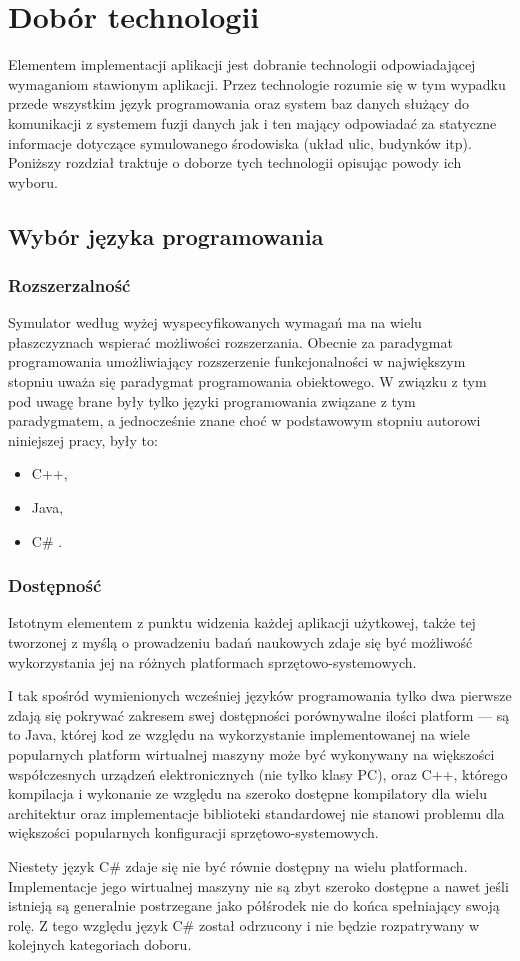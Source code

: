 {\section[Dobór technologii][Dobór technologii]{Dobór technologii}
\par{
Elementem implementacji aplikacji jest dobranie technologii odpowiadającej wymaganiom stawionym aplikacji. Przez technologie rozumie się w tym wypadku przede wszystkim język programowania oraz system baz danych służący do komunikacji z systemem fuzji danych jak i ten mający odpowiadać za statyczne informacje dotyczące symulowanego środowiska (układ ulic, budynków itp).
Poniższy rozdział traktuje o doborze tych technologii opisując powody ich wyboru.
}
\subsection{Wybór języka programowania}
\subsubsection{Rozszerzalność}
\par{
Symulator według wyżej wyspecyfikowanych wymagań ma na wielu płaszczyznach wspierać możliwości rozszerzania. Obecnie za paradygmat programowania umożliwiający rozszerzenie funkcjonalności w największym stopniu uważa się paradygmat programowania obiektowego.
W związku z tym pod uwagę brane były tylko języki programowania związane z tym paradygmatem, a jednocześnie znane choć w podstawowym stopniu autorowi niniejszej pracy, były to:
\begin{itemize}
\item C++,
\item Java,
\item C\# .
\end{itemize}
}
\subsubsection{Dostępność}
\par{
Istotnym elementem z punktu widzenia każdej aplikacji użytkowej, także tej tworzonej z myślą o prowadzeniu badań naukowych zdaje się być możliwość wykorzystania jej na różnych platformach sprzętowo-systemowych.
}
\par{
I tak spośród wymienionych wcześniej języków programowania tylko dwa pierwsze zdają się pokrywać zakresem swej dostępności porównywalne ilości platform --- są to Java, której kod ze względu na wykorzystanie implementowanej na wiele popularnych platform wirtualnej maszyny może być wykonywany na większości współczesnych urządzeń elektronicznych (nie tylko klasy PC), oraz C++, którego kompilacja i wykonanie ze względu na szeroko dostępne kompilatory dla wielu architektur oraz implementacje biblioteki standardowej nie stanowi problemu dla większości popularnych konfiguracji sprzętowo-systemowych.
}
\par{
Niestety język C\# zdaje się nie być równie dostępny na wielu platformach. Implementacje jego wirtualnej maszyny nie są zbyt szeroko dostępne a nawet jeśli istnieją są generalnie postrzegane jako półśrodek nie do końca spełniający swoją rolę. Z tego względu język C\# został odrzucony i nie będzie rozpatrywany w kolejnych kategoriach doboru.
}
}
